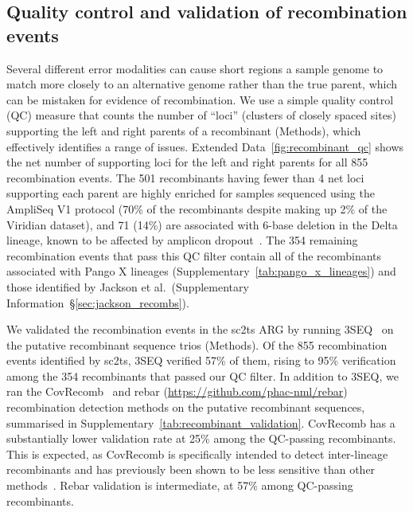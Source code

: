 \documentclass[12pt]{article}
\newcommand{\supref}[1]{Supplementary Information~\S\ref{#1}}
\newcommand{\edref}[1]{Extended Data~\ref{#1}}
\newcommand{\siref}[1]{Supplementary~\ref{#1}}
\begin{document}
\subsection*{Quality control and validation of recombination events}
Several different error modalities can cause short regions
a sample genome to match more closely
to an alternative genome rather than the true parent,
which can be mistaken for evidence of recombination.
We use a simple quality control (QC) measure
that counts the number of ``loci'' (clusters of closely spaced sites)
supporting the left and right parents of a recombinant (Methods),
which effectively identifies a range of issues.
\edref{fig:recombinant_qc} shows
the net number of supporting loci for the left and right parents
for all 855 recombination events.
The 501 recombinants having fewer than 4 net loci supporting each parent
are highly enriched for samples sequenced using the AmpliSeq V1 protocol
(70\% of the recombinants despite making up 2\% of the Viridian dataset), and
71 (14\%) are associated with 6-base deletion in the Delta lineage,
known to be affected by amplicon dropout~\cite{Sanderson2021}.
The 354 remaining recombination events that pass this QC filter
contain all of the recombinants associated with Pango X lineages
(\siref{tab:pango_x_lineages}) and
those identified by Jackson et al.\ (\supref{sec:jackson_recombs}).

We validated the recombination events in the sc2ts ARG
by running 3SEQ~\cite{Lam2018improved}
on the putative recombinant sequence trios (Methods).
Of the 855 recombination events identified by sc2ts,
3SEQ verified 57\% of them,
rising to 95\% verification among the 354 recombinants that passed our QC filter.
In addition to 3SEQ, we ran the CovRecomb~\cite{Li2024CovRecomb}
and rebar (\url{https://github.com/phac-nml/rebar}) recombination detection methods
on the putative recombinant sequences,
summarised in \siref{tab:recombinant_validation}.
CovRecomb has a substantially lower validation rate
at 25\% among the QC-passing recombinants.
This is expected, as CovRecomb is specifically intended
to detect inter-lineage recombinants
and has previously been shown to be
less sensitive than other methods~\cite{Li2024CovRecomb}.
Rebar validation is intermediate, at 57\% among QC-passing recombinants.
\end{document}
